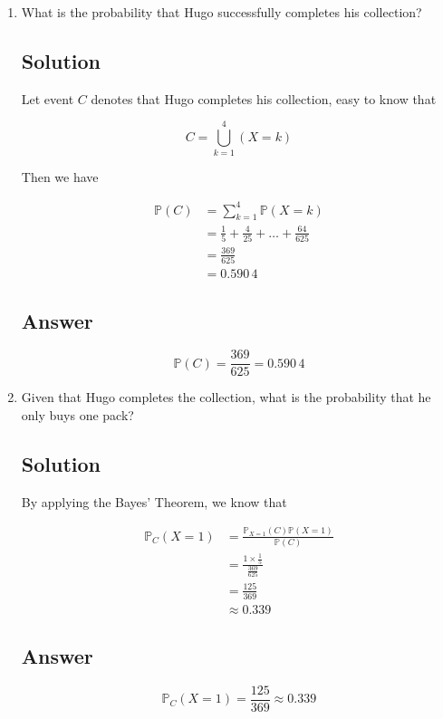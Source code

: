 \documentclass[12pt]{article}
\newcommand{\bP}{\mathbb{P}}
\begin{document}
\begin{enumerate}[start=1,label={\bfseries Part \arabic*:},leftmargin=0in]
		\bigskip\item What is the probability that Hugo successfully completes his collection?
		
		\subsection*{Solution}
		
		Let event $C$ denotes that Hugo completes his collection, easy to know that
		
		\[C = \bigcup_{k=1}^4(X = k)\]
		
		Then we have
		
		\[
			\begin{aligned}
				\bP(C) &= \sum_{k=1}^4\bP(X = k)\\
				&= \frac{1}{5} + \frac{4}{25} +\dots + \frac{64}{625}\\
				&= \frac{369}{625}\\
				&= 0.590\,4
			\end{aligned}
		\]
		
		\subsection*{Answer}
		
			\[\boxed{\bP(C) = \frac{369}{625} = 0.590\,4}\]
			
		\bigskip\item Given that Hugo completes the collection, what is the probability that he only buys one pack?
		
		\subsection*{Solution}
		
		By applying the Bayes’ Theorem, we know that
		
		\[
			\begin{aligned}
				\bP_C(X = 1) &= \frac{\bP_{X = 1}(C)\bP(X = 1)}{\bP(C)}\\
				&= \frac{1\times \frac{1}{5}}{\frac{369}{625}}\\
				&= \frac{125}{369}\\
				&\approx 0.339
			\end{aligned}
		\]
		
		\subsection*{Answer}
		
			\[\boxed{\bP_C(X = 1) = \frac{125}{369} \approx 0.339}\]
	\end{enumerate}
	
\end{document}

